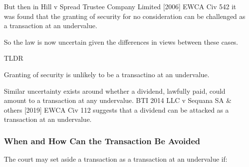 \documentclass[
]{article}
\newenvironment{env-440d3209-5a60-4bb6-8a13-881ba9304f97}
{
    \savenotes\tcolorbox[blanker,breakable,left=5pt,borderline west={2pt}{-4pt}{blue}]
}
{
    \endtcolorbox\spewnotes
}
\begin{document}
But then in Hill v Spread Trustee Company Limited {[}2006{]} EWCA Civ
542 it was found that the granting of security for no consideration can
be challenged as a transaction at an undervalue.

So the law is now uncertain given the differences in views between these
cases.

\begin{env-440d3209-5a60-4bb6-8a13-881ba9304f97}

TLDR

Granting of security is unlikely to be a transactino at an undervalue.

\end{env-440d3209-5a60-4bb6-8a13-881ba9304f97}

Similar uncertainty exists around whether a dividend, lawfully paid,
could amount to a transaction at any undervalue. BTI 2014 LLC v Sequana
SA \& others {[}2019{]} EWCA Civ 112 suggests that a dividend can be
attacked as a transaction at an undervalue.

\hypertarget{when-and-how-can-the-transaction-be-avoided}{%
\subsubsection{When and How Can the Transaction Be
Avoided}\label{when-and-how-can-the-transaction-be-avoided}}

The court may set aside a transaction as a transaction at an undervalue
if:
\end{document}
